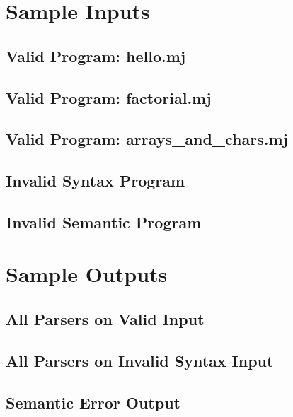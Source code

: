 \documentclass[12pt,a4paper]{article}
\begin{document}
\section{Sample Inputs}

\subsection{Valid Program: hello.mj}


\subsection{Valid Program: factorial.mj}


\subsection{Valid Program: arrays\_and\_chars.mj}


\subsection{Invalid Syntax Program}


\subsection{Invalid Semantic Program}


\section{Sample Outputs}

\subsection{All Parsers on Valid Input}


\subsection{All Parsers on Invalid Syntax Input}


\subsection{Semantic Error Output}

\end{document}
